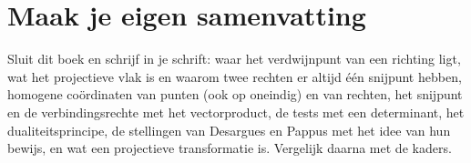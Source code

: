 \begin{oefeningen}






\end{oefeningen}


\ifzelfstudie
\section*{Maak je eigen samenvatting}
Sluit dit boek en schrijf in je schrift: waar het verdwijnpunt van een richting ligt, wat het projectieve vlak is en waarom twee rechten er altijd één snijpunt hebben, homogene coördinaten van punten (ook op oneindig) en van rechten, het snijpunt en de verbindingsrechte met het vectorproduct, de tests met een determinant, het dualiteitsprincipe, de stellingen van Desargues en Pappus met het idee van hun bewijs, en wat een projectieve transformatie is. Vergelijk daarna met de kaders.
\fi
